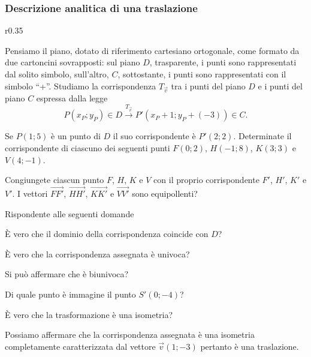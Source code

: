 \subsubsection{Descrizione analitica di una traslazione}

\setlength{\intextsep}{3pt plus 2.0pt minus 2.0pt}
\begin{wrapfigure}{r}{0.35\textwidth}
	
	\centering
\end{wrapfigure}
Pensiamo il piano, dotato di riferimento cartesiano ortogonale, come 
formato da due cartoncini sovrapposti: sul piano $D$, trasparente, i 
punti sono rappresentati dal solito simbolo, sull'altro, $C$, 
sottostante, i punti sono rappresentati con il simbolo ``+''.
Studiamo la corrispondenza $T_{\vec{v}}$ tra i punti del piano $D$ e 
i punti del piano $C$ espressa dalla legge
\[P(x_P;y_P)\in D \overset{T_{\vec{v}}}\rightarrow 
P'(x_P+1;y_P+(-3))\in C.\]


Se $P(1;5)$ è un punto di $D$ il suo corrispondente è $P'(2;2)$. 
Determinate il corrispondente di ciascuno dei seguenti punti 
$F(0;2)$, $H(-1;8)$, $K(3;3)$ e $V(4;-1)$.

Congiungete ciascun punto $F$, $H$, $K$ e $V$ con il proprio 
corrispondente $F'$, $H'$, $K'$ e $V'$. I vettori 
$\overrightarrow{FF'}$, $\overrightarrow{HH'}$, 
$\overrightarrow{KK'}$ e $\overrightarrow{VV'}$ sono equipollenti?

Rispondente alle seguenti domande
\begin{itemize*}
  \item È vero che il dominio della corrispondenza coincide con $D$?
  \item È vero che la corrispondenza assegnata è univoca?
  \item Si può affermare che è biunivoca?
  \item Di quale punto è immagine il punto $S'(0;-4)$?
  \item È vero che la trasformazione è una isometria?
\end{itemize*}

Possiamo affermare che la corrispondenza assegnata è una isometria 
completamente caratterizzata dal vettore $\vec{v}(1;-3)$ pertanto è 
una traslazione.

